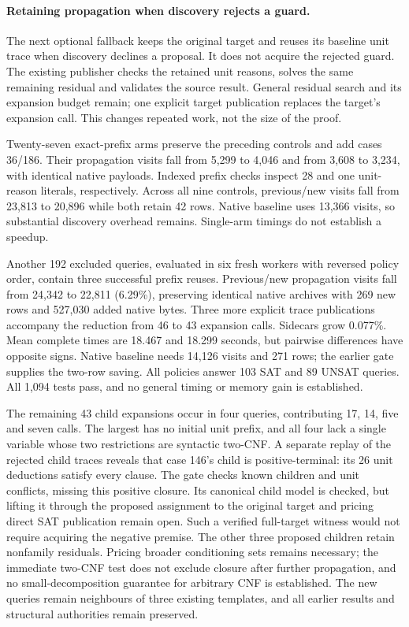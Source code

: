 \documentclass[11pt,a4paper]{article}
\numberwithin{equation}{section}
\theoremstyle{plain}
\theoremstyle{definition}
\theoremstyle{remark}
\begin{document}
\paragraph{Retaining propagation when discovery rejects a guard.}
The next optional fallback keeps the original target and reuses its baseline
unit trace when discovery declines a proposal. It does not acquire the rejected
guard. The existing publisher checks the retained unit reasons, solves the same
remaining residual and validates the source result. General residual search and
its expansion budget remain; one explicit target publication replaces the
target's expansion call. This changes repeated work, not the size of the proof.

Twenty-seven exact-prefix arms preserve the preceding controls and add cases
36/186. Their propagation visits fall from 5,299 to 4,046 and from 3,608 to 3,234,
with identical native payloads. Indexed prefix checks inspect 28 and one
unit-reason literals, respectively. Across all nine controls, previous/new
visits fall from 23,813 to 20,896 while both retain 42 rows. Native baseline uses
13,366 visits, so substantial discovery overhead remains. Single-arm timings
do not establish a speedup.

Another 192 excluded queries, evaluated in six fresh workers with reversed
policy order, contain three successful prefix reuses. Previous/new propagation
visits fall from 24,342 to 22,811 (6.29\%), preserving identical native archives
with 269 new rows and 527,030 added native bytes. Three more explicit trace
publications accompany the reduction from 46 to 43 expansion calls. Sidecars
grow 0.077\%. Mean complete times are 18.467 and 18.299 seconds, but pairwise
differences have opposite signs. Native baseline needs 14,126 visits and 271
rows; the earlier gate supplies the two-row saving. All policies answer 103 SAT
and 89 UNSAT queries. All 1,094 tests pass, and no general timing or memory gain
is established.

The remaining 43 child expansions occur in four queries, contributing
17, 14, five and seven calls. The largest has no initial unit prefix, and all
four lack a single variable whose two restrictions are syntactic two-CNF.
A separate replay of the rejected child traces reveals that case 146's child
is positive-terminal: its 26 unit deductions satisfy every clause. The gate
checks known children and unit conflicts, missing this positive closure. Its
canonical child model is checked, but lifting it through the proposed assignment
to the original target and pricing direct SAT publication remain open. Such a
verified full-target witness would not require acquiring the negative premise.
The other three proposed children retain nonfamily residuals. Pricing broader
conditioning sets remains necessary; the immediate two-CNF test does not exclude
closure after further propagation, and no small-decomposition guarantee for
arbitrary CNF is established. The new queries remain neighbours of three existing
templates, and all earlier results and structural authorities remain preserved.
\end{document}
